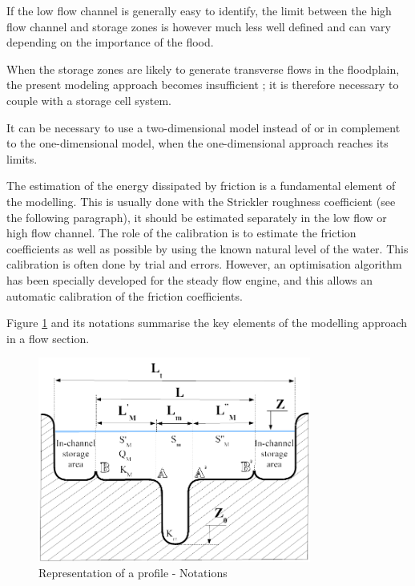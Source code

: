 If the low flow channel is generally easy to identify, the limit between the high flow channel and storage zones is however much less well defined and can vary depending on the importance of the flood.

When the storage zones are likely to generate transverse flows in the floodplain, the present modeling approach becomes insufficient ; it is therefore necessary to couple \mascaret{} with a storage cell system.

It can be necessary to use a two-dimensional model instead of or in complement to the one-dimensional model, when the one-dimensional approach reaches its limits.

The estimation of the energy dissipated by friction is a fundamental element of the modelling. This is usually done with the Strickler roughness coefficient (see the following paragraph), it should be estimated separately in the low flow or high flow channel. The role of the calibration is to estimate the friction coefficients as well as possible by using the known natural level of the water. This calibration is often done by trial and errors. However, an optimisation algorithm has been specially developed for the steady flow engine, and this allows an automatic calibration of the friction coefficients.

Figure \ref{fig:SchemProf} and its notations summarise the key elements of the modelling approach in a flow section.

\begin{figure}[H]
 \begin{center}
  \includegraphics[width=0.8\textwidth]{Figures/Schema_profil.png}
  \caption{Representation of a profile - Notations}
  \label{fig:SchemProf}
 \end{center}
\end{figure}

